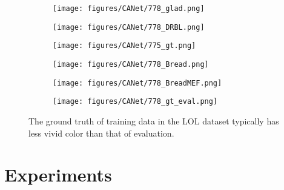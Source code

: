 \documentclass[10pt,twocolumn,letterpaper]{article}
\begin{document}
\begin{figure}[t]
\begin{subfigure}{0.32\linewidth}
    \texttt{[image: figures/CANet/778\_glad.png]}
\end{subfigure}
\begin{subfigure}{0.32\linewidth}
    \texttt{[image: figures/CANet/778\_DRBL.png]}
\end{subfigure}
\begin{subfigure}{0.32\linewidth}
    \texttt{[image: figures/CANet/775\_gt.png]}
\end{subfigure} 

\begin{subfigure}{0.32\linewidth}
    \texttt{[image: figures/CANet/778\_Bread.png]}
\end{subfigure}
\begin{subfigure}{0.32\linewidth}
    \texttt{[image: figures/CANet/778\_BreadMEF.png]}
\end{subfigure}
\begin{subfigure}{0.32\linewidth}
    \texttt{[image: figures/CANet/778\_gt\_eval.png]}
\end{subfigure}

\caption{The ground truth of training data in the LOL dataset typically has less vivid color than that of evaluation. } \label{fig:lighter_color}
\end{figure}

\section{Experiments}
\end{document}
